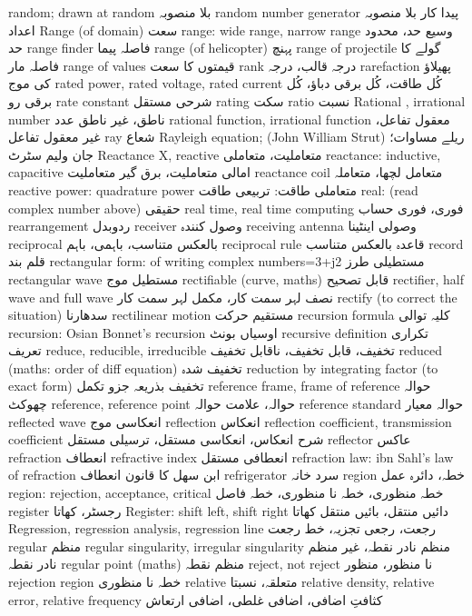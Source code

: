 random; drawn at random	بلا منصوبہ
random number generator	پیدا کار بلا منصوبہ اعداد
Range (of domain)	سعت
range: wide range, narrow range	وسیع حد، محدود حد
range finder	فاصلہ پیما
range (of helicopter)	پہنچ
range of projectile	گولے کا فاصلہ مار
range of values	قیمتوں کا سعت
rank	درجہ قالب، درجہ
rarefaction	پھیلاؤ کی موج
rated power, rated voltage, rated current	 کُل طاقت، کُل برقی دباؤ، کُل برقی رو
rate constant	شرحی مستقل
rating	سکت
ratio	نسبت
Rational , irrational number	ناطق، غیر ناطق عدد
rational function, irrational function	معقول تفاعل، غیر معقول تفاعل
ray	شعاع
Rayleigh equation; (John William Strut)	ریلے مساوات؛ جان ولیم سٹرٹ
Reactance X, reactive	متعاملیت، متعاملی
reactance: inductive, capacitive	امالی متعاملیت، برق گیر متعاملیت
reactance coil	متعامل لچھا، متعاملہ
reactive power: quadrature power 	متعاملی طاقت: تربیعی طاقت
real: (read complex number above)	حقیقی
real time, real time computing	فوری، فوری حساب
rearrangement	ردوبدل
receiver	وصول کنندہ
receiving antenna	وصولی اینٹینا
reciprocal	بالعکس متناسب، باہمی، باہم
reciprocal rule	قاعدہ بالعکس متناسب
record	قلم بند
rectangular form: of writing complex numbers=3+j2	مستطیلی طرز
rectangular wave	مستطیل موج
rectifiable (curve, maths)	قابل تصحیح
rectifier, half wave and full wave	نصف لہر سمت کار، مکمل لہر سمت کار
rectify (to correct the situation)	سدھارنا
rectilinear motion	مستقیم حرکت
recursion formula	کلیہ توالی
recursion: Osian Bonnet's recursion	اوسیاں بونٹ
recursive definition	تکراری تعریف
reduce, reducible, irreducible	تخفیف، قابل تخفیف، ناقابل تخفیف
reduced (maths: order of diff equation)	تخفیف شدہ
reduction by integrating factor (to exact form)	تخفیف بذریعہ جزو تکمل
reference frame, frame of reference	حوالہ چھوکٹ
reference, reference point	حوالہ، علامت حوالہ
reference standard	حوالہ معیار
reflected wave	انعکاسی موج
reflection	انعکاس
reflection coefficient, transmission coefficient	شرح انعکاس، انعکاسی مستقل، ترسیلی مستقل
reflector	عاکس
refraction	انعطاف
refractive index	انعطافی مستقل
refraction law: ibn Sahl's law of refraction	ابن سھل کا قانون انعطاف
refrigerator	سرد خانہ
region	خطہ، دائرہ عمل
region: rejection, acceptance, critical	خطہ منظوری، خطہ نا منظوری، خطہ فاصل
register	رجسٹر، کھاتا
Register: shift left, shift right	دائیں منتقل، بائیں منتقل کھاتا
Regression, regression analysis, regression line	 رجعت، رجعی تجزیہ، خط رجعت
regular	منظم
regular singularity, irregular singularity	منظم نادر نقطہ، غیر منظم نادر نقطہ
regular point (maths)	منظم نقطہ
reject, not reject	نا منظور، منظور
rejection region	خطہ نا منظوری
relative	متعلقہ، نسبتا
relative density, relative error, relative frequency	کثافتِ اضافی، اضافی غلطی، اضافی ارتعاش
